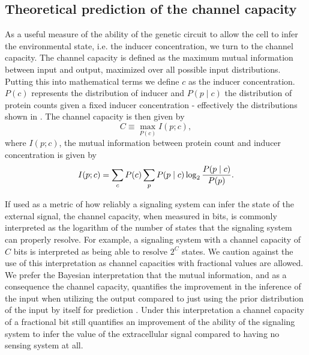 \subsection{Theoretical prediction of the channel capacity}
\label{sec_channcap}

As a useful measure of the ability of the genetic circuit to allow the cell to
infer the environmental state, i.e. the inducer concentration, we turn to the
channel capacity. The channel capacity is defined as the maximum mutual
information between input and output, maximized over all possible input
distributions. Putting this into mathematical terms we define $c$ as the
inducer concentration. $P(c)$ represents the distribution of inducer and $P(p
\mid c)$ the distribution of protein counts given a fixed inducer concentration
- effectively the distributions shown in . The channel
capacity is then given by
\begin{equation}
  C \equiv \max_{P(c)} I(p; c),
  \label{eq_chann_cap}
\end{equation}
where $I(p; c)$, the mutual information between protein count and inducer
concentration is given by \cite{Shannon1948}
\begin{equation}
  I(p; c) = \sum_c P(c) \sum_p P(p \mid c) \log_2 {P(p \mid c) \over P(p)}.
\end{equation}

If used as a metric of how reliably a signaling system can infer the state
of the external signal, the channel capacity, when measured in bits, is commonly
interpreted as the logarithm of the number of states that the signaling system
can properly resolve. For example, a signaling system with a channel capacity
of $C$ bits is interpreted as being able to resolve $2^C$ states. We caution
against the use of this interpretation as channel capacities with fractional
values are allowed. We prefer the Bayesian interpretation that the mutual
information, and as a consequence the channel capacity, quantifies the
improvement in the inference of the input when utilizing the output compared to
just using the prior distribution of the input by itself for prediction
\cite{Voliotis2014, Bowsher2014}. Under this interpretation a channel capacity
of a fractional bit still quantifies an improvement of the ability of the
signaling system to infer the value of the extracellular signal compared to
having no sensing system at all.

